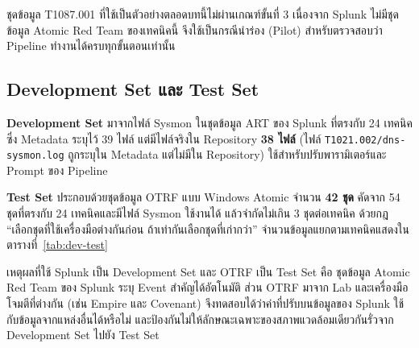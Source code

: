 ชุดข้อมูล T1087.001 ที่ใช้เป็นตัวอย่างตลอดบทนี้ไม่ผ่านเกณฑ์ขั้นที่ 3
เนื่องจาก Splunk ไม่มีชุดข้อมูล Atomic Red Team ของเทคนิคนี้
จึงใช้เป็นกรณีนำร่อง (Pilot) สำหรับตรวจสอบว่า Pipeline ทำงานได้ครบทุกขั้นตอนเท่านั้น

\subsection{Development Set และ Test Set}
\textbf{Development Set} มาจากไฟล์ Sysmon ในชุดข้อมูล ART ของ Splunk ที่ตรงกับ 24 เทคนิค
ซึ่ง Metadata ระบุไว้ 39 ไฟล์ แต่มีไฟล์จริงใน Repository \textbf{38 ไฟล์}
(ไฟล์ \texttt{T1021.002/dns-sysmon.log} ถูกระบุใน Metadata แต่ไม่มีใน Repository)
ใช้สำหรับปรับพารามิเตอร์และ Prompt ของ Pipeline

\textbf{Test Set} ประกอบด้วยชุดข้อมูล OTRF แบบ Windows Atomic จำนวน \textbf{42 ชุด}
คัดจาก 54 ชุดที่ตรงกับ 24 เทคนิคและมีไฟล์ Sysmon ใช้งานได้
แล้วจำกัดไม่เกิน 3 ชุดต่อเทคนิค ด้วยกฎ ``เลือกชุดที่ใช้เครื่องมือต่างกันก่อน ถ้าเท่ากันเลือกชุดที่เก่ากว่า''
จำนวนข้อมูลแยกตามเทคนิคแสดงในตารางที่~\ref{tab:dev-test}

เหตุผลที่ใช้ Splunk เป็น Development Set และ OTRF เป็น Test Set คือ
ชุดข้อมูล Atomic Red Team ของ Splunk ระบุ Event สำคัญได้อัตโนมัติ
ส่วน OTRF มาจาก Lab และเครื่องมือโจมตีที่ต่างกัน (เช่น Empire และ Covenant)
จึงทดสอบได้ว่าค่าที่ปรับบนข้อมูลของ Splunk ใช้กับข้อมูลจากแหล่งอื่นได้หรือไม่
และป้องกันไม่ให้ลักษณะเฉพาะของสภาพแวดล้อมเดียวกันรั่วจาก Development Set ไปยัง Test Set

